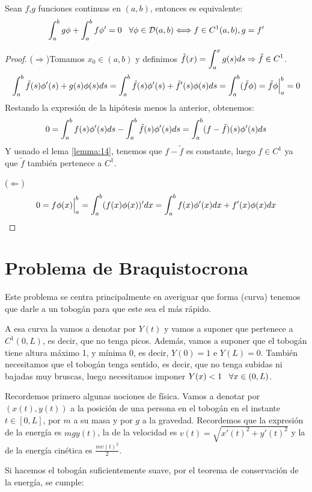 \begin{lemma}
Sean $f$,$g$ funciones continuas en $(a,b)$, entonces es equivalente:
\[
\displaystyle\int_{ a }^{ b } g\phi+\displaystyle\int_{ a }^{ b } f\phi'=0 \;\;\; \forall\phi\in\mathcal{D}(a,b) \Longleftrightarrow f\in C^1(a,b), g=f'
\]
\end{lemma}

\begin{proof}

($\Rightarrow$)Tomamos $x_0\in(a,b)$ y definimos $\tilde{f}(x)=\displaystyle\int_{ a }^{ x } g(s)ds\Rightarrow \tilde{f}\in C^1$.
\[
\displaystyle\int_{ a }^{ b } \tilde{f}(s)\phi'(s)+g(s)\phi(s)ds=\displaystyle\int_{ a }^{ b } \tilde{f}(s)\phi'(s)+\tilde{f}'(s)\phi(s)ds=\displaystyle\int_{ a }^{ b } (\tilde{f}\phi)=\tilde{f}\phi\Big|_a^b=0
\]
Restando la expresión de la hipótesis menos la anterior, obtenemos:
\[
0=\displaystyle\int_{ a }^{ b } f(s)\phi'(s)ds-\displaystyle\int_{ a }^{ b } \tilde{f}(s)\phi'(s)ds=\displaystyle\int_{ a }^{ b } (f-\tilde{f})(s)\phi'(s)ds
\]
Y usnado el lema \ref{lemma:14}, tenemos que $f-\tilde{f}$ es constante, luego $f\in C^1$ ya que $\tilde{f}$ también pertenece a $C^1$.

($\Leftarrow$) 
\[
0=f\phi(x)\Big|_a^b=\displaystyle\int_{ a }^{ b } (f(x)\phi(x))'dx=\displaystyle\int_{ a }^{ b } f(x)\phi'(x)dx+f'(x)\phi(x)dx
\]
\end{proof}

\section{Problema de Braquistocrona}

Este problema se centra principalmente en averiguar que forma (curva) tenemos que darle a un tobogán para que este sea el más rápido.

A esa curva la vamos a denotar por $Y(t)$ y vamos a suponer que  pertenece a $C^1(0,L)$, es decir, que no tenga picos. Además, vamos a suponer que el tobogán tiene altura máximo 1, y mínima 0, es decir, $Y(0)=1$ e $Y(L)=0$. También necesitamos que el tobogán tenga sentido, es decir, que no tenga subidas ni bajadas muy bruscas, luego necesitamos imponer $Y(x)<1 \;\;\; \forall x \in (0,L)$.

Recordemos primero algunas nociones de física. Vamos a denotar por $(x(t),y(t))$ a la posición de una persona en el tobogán en el instante $t\in[0,L]$, por $m$ a su masa y por $g$ a la gravedad. Recordemos que la expresión de la energía es $mgy(t)$, la de la velocidad es $v(t)=\sqrt{x'(t)^2+y'(t)^2}$ y la de la energía cinética es $\frac{mv(t)^2}{2}$.

Si hacemos el tobogán suficientemente suave, por el teorema de conservación de la energía, se cumple:

